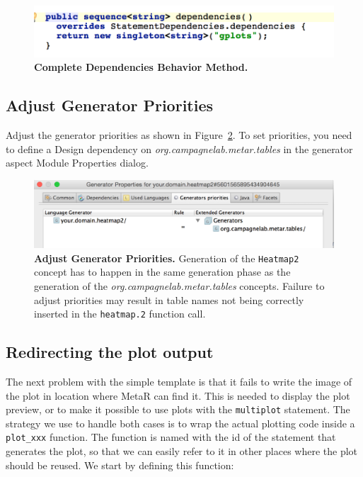 \begin{figure}
  \centering
  \includegraphics[width=\figWidthSmall]{figures/dependenciesMethodComplete.png}
\caption[Complete Dependencies Behavior Method.]{\textbf{Complete Dependencies Behavior Method.}}
\label{fig:dependenciesMethodComplete}
\end{figure}

\subsection{Adjust Generator Priorities}
Adjust the generator priorities as shown in Figure~\ref{fig:Generator_Properties_your_domain_heatmap2}. To set priorities, you need to define a Design dependency on \textit{org.campagnelab.metar.tables} in the generator aspect Module Properties dialog. 

\begin{figure}[h!tbp]
  \centering
  \includegraphics[width=\figWidthWide]{figures/Generator_Properties_your_domain_heatmap2.png}
\caption[Adjust Generator Priorities.]{\textbf{Adjust Generator Priorities.} Generation of the \texttt{Heatmap2} concept has to happen in the same generation phase as the generation of the  \textit{org.campagnelab.metar.tables} concepts. Failure to adjust priorities may result in table names not being correctly inserted in the \texttt{heatmap.2} function call.}
\label{fig:Generator_Properties_your_domain_heatmap2}
\end{figure}

\subsection{Redirecting the plot output}
The next problem with the simple template is that it fails to write the image of the plot in  location where MetaR can find it. This is needed to display the plot preview, or to make it possible to use plots with the \texttt{multiplot} statement.
The strategy we use to handle both cases is to wrap the actual plotting code inside a \texttt{plot\_xxx} function. The function is named with the id of the statement that generates the plot, so that we can easily refer to it in other places where the plot should be reused. We start by defining this function:

